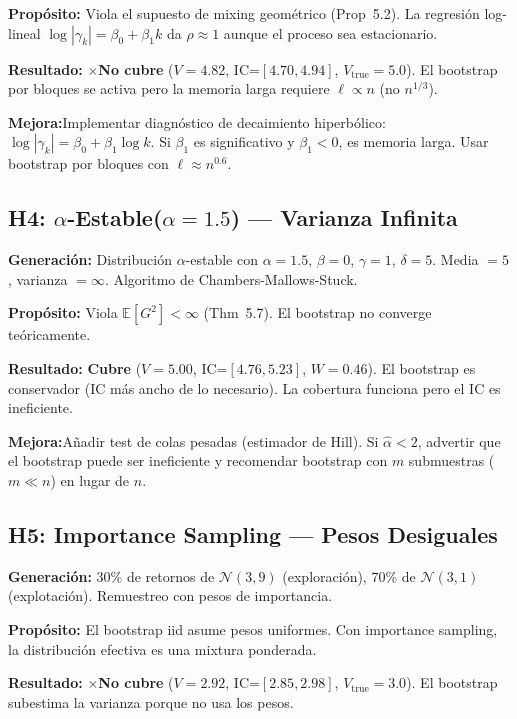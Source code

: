 \documentclass[12pt,a4paper]{article}
\newcommand{\ok}{\textcolor{cbgreen}{\checkmark}}
\newcommand{\fail}{\textcolor{cbred}{$\times$}}
\newcommand{\mejora}{\textbf{Mejora:}}
\begin{document}
\textbf{Propósito:} Viola el supuesto de mixing geométrico (Prop~5.2). La regresión log-lineal $\log|\gamma_k| = \beta_0 + \beta_1 k$ da $\hat{\rho} \approx 1$ aunque el proceso sea estacionario.

\textbf{Resultado:} \fail \textbf{No cubre} ($V=4.82$, IC=$[4.70,4.94]$, $V_{\text{true}}=5.0$). El bootstrap por bloques se activa pero la memoria larga requiere $\ell \propto n$ (no $n^{1/3}$).

\mejora Implementar diagnóstico de decaimiento hiperbólico: $\log|\gamma_k| = \beta_0 + \beta_1 \log k$. Si $\beta_1$ es significativo y $\beta_1 < 0$, es memoria larga. Usar bootstrap por bloques con $\ell \approx n^{0.6}$.

\subsection{H4: $\alpha$-Estable($\alpha=1.5$) — Varianza Infinita}

\textbf{Generación:} Distribución $\alpha$-estable con $\alpha=1.5$, $\beta=0$, $\gamma=1$, $\delta=5$. Media $=5$, varianza $=\infty$. Algoritmo de Chambers-Mallows-Stuck.

\textbf{Propósito:} Viola $\mathbb{E}[G^2] < \infty$ (Thm~5.7). El bootstrap no converge teóricamente.

\textbf{Resultado:} \ok \textbf{Cubre} ($V=5.00$, IC=$[4.76,5.23]$, $W=0.46$). El bootstrap es conservador (IC más ancho de lo necesario). La cobertura funciona pero el IC es ineficiente.

\mejora Añadir test de colas pesadas (estimador de Hill). Si $\hat{\alpha} < 2$, advertir que el bootstrap puede ser ineficiente y recomendar bootstrap con $m$ submuestras ($m \ll n$) en lugar de $n$.

\subsection{H5: Importance Sampling — Pesos Desiguales}

\textbf{Generación:} 30\% de retornos de $\mathcal{N}(3,9)$ (exploración), 70\% de $\mathcal{N}(3,1)$ (explotación). Remuestreo con pesos de importancia.

\textbf{Propósito:} El bootstrap iid asume pesos uniformes. Con importance sampling, la distribución efectiva es una mixtura ponderada.

\textbf{Resultado:} \fail \textbf{No cubre} ($V=2.92$, IC=$[2.85,2.98]$, $V_{\text{true}}=3.0$). El bootstrap subestima la varianza porque no usa los pesos.
\end{document}
